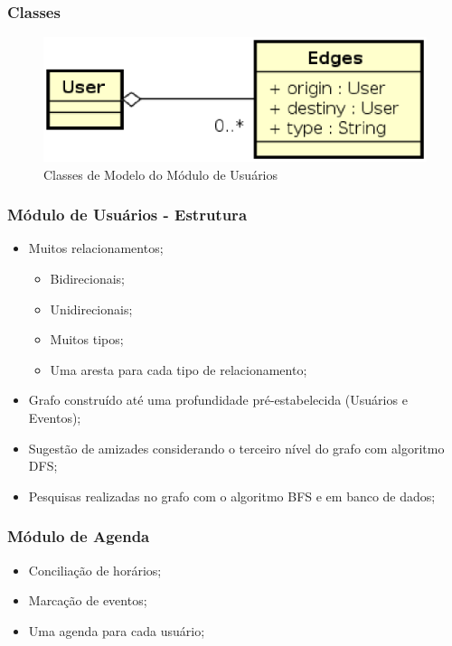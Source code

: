 \documentclass{beamer}
\begin{document}
\begin{frame}
\frametitle{Classes}

\begin{figure}[!h]
	\centering
	\includegraphics[scale=0.6]{figuras/modulo_usuarios.eps}
	\caption{Classes de Modelo do Módulo de Usuários}
\end{figure}

\end{frame}

\begin{frame}
\frametitle{Módulo de Usuários - Estrutura}

\begin{itemize}
	\item Muitos relacionamentos;
	\begin{itemize}
		\item Bidirecionais;
		\item Unidirecionais;
		\item Muitos tipos;
		\item Uma aresta para cada tipo de relacionamento;
	\end{itemize}
	\item Grafo construído até uma profundidade pré-estabelecida (Usuários e Eventos);
	\item Sugestão de amizades considerando o terceiro nível do grafo com algoritmo DFS;
	\item Pesquisas realizadas no grafo com o algoritmo BFS e em banco de dados;
\end{itemize}

\end{frame}

\begin{frame}
\frametitle{Módulo de Agenda}

\begin{itemize}
	\item Conciliação de horários;
	\item Marcação de eventos;
	\item Uma agenda para cada usuário;
\end{itemize}

\end{frame}
\end{document}
